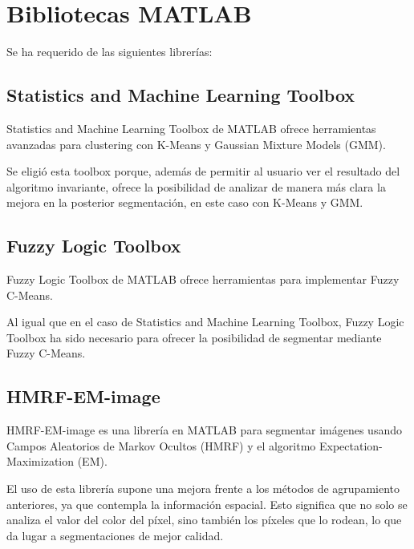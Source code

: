 \section{Bibliotecas MATLAB}\label{bibliotecas-matlab}

Se ha requerido de las siguientes librerías:

\subsection{Statistics and Machine Learning Toolbox}\label{statistics-and-Machine-Learning-Toolbox}

Statistics and Machine Learning Toolbox de MATLAB ofrece herramientas avanzadas para clustering con K-Means y Gaussian Mixture Models (GMM). 

Se eligió esta toolbox porque, además de permitir al usuario ver el resultado del algoritmo invariante, ofrece la posibilidad de analizar de manera más clara la mejora en la posterior segmentación, en este caso con K-Means y GMM.

\subsection{Fuzzy Logic Toolbox}\label{fuzzy-logic-toolbox}

Fuzzy Logic Toolbox de MATLAB ofrece herramientas para implementar Fuzzy C-Means.

Al igual que en el caso de Statistics and Machine Learning Toolbox, Fuzzy Logic Toolbox ha sido necesario para ofrecer la posibilidad de segmentar mediante Fuzzy C-Means.

\subsection{HMRF-EM-image}\label{hmrf-em-image}

HMRF-EM-image es una librería en MATLAB para segmentar imágenes usando Campos Aleatorios de Markov Ocultos (HMRF) y el algoritmo Expectation-Maximization (EM).

El uso de esta librería supone una mejora frente a los métodos de agrupamiento anteriores, ya que contempla la información espacial. Esto significa que no solo se analiza el valor del color del píxel, sino también los píxeles que lo rodean, lo que da lugar a segmentaciones de mejor calidad.

